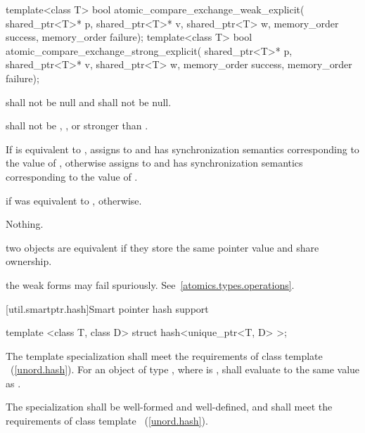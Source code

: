 %
%
%
%
\begin{itemdecl}
template<class T>
  bool atomic_compare_exchange_weak_explicit(
    shared_ptr<T>* p, shared_ptr<T>* v, shared_ptr<T> w,
    memory_order success, memory_order failure);
template<class T>
  bool atomic_compare_exchange_strong_explicit(
    shared_ptr<T>* p, shared_ptr<T>* v, shared_ptr<T> w,
    memory_order success, memory_order failure);
\end{itemdecl}

\begin{itemdescr}
\pnum
\requires {} shall not be null and  shall not be null.

\pnum
\requires {} shall not be ,
, or stronger than .

\pnum
\effects If  is equivalent to , assigns  to
 and has synchronization semantics corresponding to the value of
, otherwise assigns  to  and has
synchronization semantics corresponding to the value of .

\pnum
\returns {} if  was equivalent to ,  otherwise.

\pnum
\throws Nothing.

\pnum
\remarks two  objects are equivalent if they store the same
pointer value and share ownership.

\pnum
\remarks the weak forms may fail spuriously. See~\ref{atomics.types.operations}.
\end{itemdescr}

[util.smartptr.hash]{Smart pointer hash support}

%
\begin{itemdecl}
template <class T, class D> struct hash<unique_ptr<T, D> >;
\end{itemdecl}

\begin{itemdescr}
\pnum The template specialization shall meet the requirements of class
template ~(\ref{unord.hash}). For an object  of type ,
where  is ,  shall evaluate to
the same value as .

\pnum
\requires The specialization  shall be
well-formed and well-defined, and shall meet the requirements of class
template ~(\ref{unord.hash}).
\end{itemdescr}


